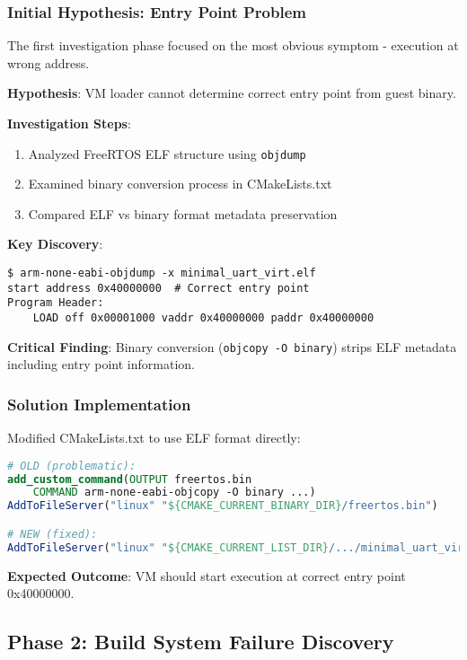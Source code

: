 \documentclass[11pt,a4paper]{article}
\begin{document}
\subsubsection{Initial Hypothesis: Entry Point Problem}

The first investigation phase focused on the most obvious symptom - execution at wrong address.

\textbf{Hypothesis}: VM loader cannot determine correct entry point from guest binary.

\textbf{Investigation Steps}:
\begin{enumerate}
\item Analyzed FreeRTOS ELF structure using \texttt{objdump}
\item Examined binary conversion process in CMakeLists.txt
\item Compared ELF vs binary format metadata preservation
\end{enumerate}

\textbf{Key Discovery}:
\begin{lstlisting}[caption=ELF Analysis Results]
$ arm-none-eabi-objdump -x minimal_uart_virt.elf
start address 0x40000000  # Correct entry point
Program Header:
    LOAD off 0x00001000 vaddr 0x40000000 paddr 0x40000000
\end{lstlisting}

\textbf{Critical Finding}: Binary conversion (\texttt{objcopy -O binary}) strips ELF metadata including entry point information.

\subsubsection{Solution Implementation}

Modified CMakeLists.txt to use ELF format directly:

\begin{lstlisting}[language=cmake, caption=ELF Loading Fix]
# OLD (problematic):
add_custom_command(OUTPUT freertos.bin
    COMMAND arm-none-eabi-objcopy -O binary ...)
AddToFileServer("linux" "${CMAKE_CURRENT_BINARY_DIR}/freertos.bin")

# NEW (fixed):
AddToFileServer("linux" "${CMAKE_CURRENT_LIST_DIR}/.../minimal_uart_virt.elf")
\end{lstlisting}

\textbf{Expected Outcome}: VM should start execution at correct entry point 0x40000000.

\subsection{Phase 2: Build System Failure Discovery}
\end{document}
